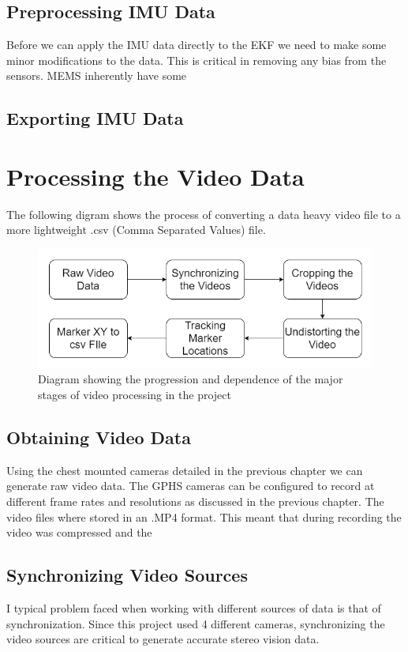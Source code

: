 \subsection{Preprocessing IMU Data}
Before we can apply the IMU data directly to the EKF we need to make some minor modifications to the data. This is critical in removing any bias from the sensors. MEMS inherently have some 

\subsection{Exporting IMU Data}


\section{Processing the Video Data}
The following digram shows the process of converting a data heavy video file to a more lightweight .csv (Comma Separated Values) file.
\begin{figure}[!ht]
  \includegraphics[width=\linewidth]{figures/videoProcess.png}
  \caption{Diagram showing the progression and dependence of the major stages of video processing in the project}
  \label{fig:videoProcess}
\end{figure}

\subsection{Obtaining Video Data}
Using the chest mounted cameras detailed in the previous chapter we can generate raw video data. The GPHS cameras can be configured to record at different frame rates and resolutions as discussed in the previous chapter. The video files where stored in an .MP4 format. This meant that during recording the video was compressed and the 


\subsection{Synchronizing Video Sources}
I typical problem faced when working with different sources of data is that of synchronization. Since this project used 4 different cameras, synchronizing the video sources are critical to generate accurate stereo vision data.

